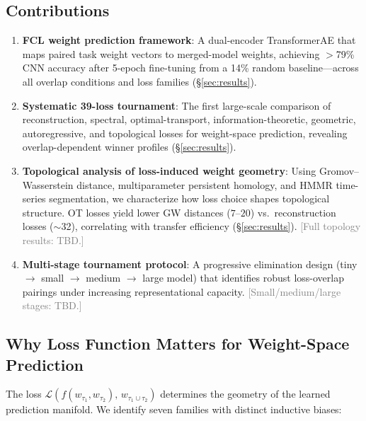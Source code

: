 \subsection{Contributions}

\begin{enumerate}
    \item \textbf{FCL weight prediction framework}: A dual-encoder TransformerAE that maps paired task weight vectors to merged-model weights, achieving $>$79\% CNN accuracy after 5-epoch fine-tuning from a 14\% random baseline---across all overlap conditions and loss families (\S\ref{sec:results}).

    \item \textbf{Systematic 39-loss tournament}: The first large-scale comparison of reconstruction, spectral, optimal-transport, information-theoretic, geometric, autoregressive, and topological losses for weight-space prediction, revealing overlap-dependent winner profiles (\S\ref{sec:results}).

    \item \textbf{Topological analysis of loss-induced weight geometry}: Using Gromov--Wasserstein distance, multiparameter persistent homology, and HMMR time-series segmentation, we characterize how loss choice shapes topological structure. OT losses yield lower GW distances ($7$--$20$) vs.\ reconstruction losses ($\sim$32), correlating with transfer efficiency (\S\ref{sec:results}). \textcolor{gray}{[Full topology results: TBD.]}

    \item \textbf{Multi-stage tournament protocol}: A progressive elimination design (tiny $\to$ small $\to$ medium $\to$ large model) that identifies robust loss-overlap pairings under increasing representational capacity. \textcolor{gray}{[Small/medium/large stages: TBD.]}
\end{enumerate}

\subsection{Why Loss Function Matters for Weight-Space Prediction}

The loss $\mathcal{L}(f(w_{\tau_1}, w_{\tau_2}),\, w_{\tau_1\cup\tau_2})$ determines the geometry of the learned prediction manifold. We identify seven families with distinct inductive biases:

